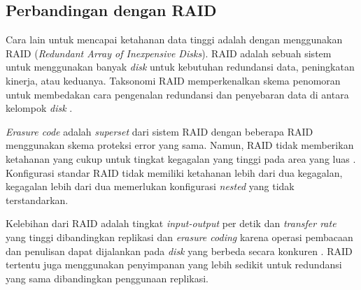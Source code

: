 \subsection{Perbandingan dengan RAID}

Cara lain untuk mencapai ketahanan data tinggi adalah dengan menggunakan RAID (\textit{Redundant Array of Inexpensive Disks}). RAID adalah sebuah sistem untuk menggunakan banyak \textit{disk} untuk kebutuhan redundansi data, peningkatan kinerja, atau keduanya. Taksonomi RAID memperkenalkan skema penomoran untuk membedakan cara pengenalan redundansi dan penyebaran data di antara kelompok \textit{disk} \parencite{katz2010raid}.


\textit{Erasure code} adalah \textit{superset} dari sistem RAID dengan beberapa RAID menggunakan skema proteksi error yang sama. Namun, RAID tidak memberikan ketahanan yang cukup untuk tingkat kegagalan yang tinggi pada area yang luas \parencite{weatherspoon2002erasure}. Konfigurasi standar RAID tidak memiliki ketahanan lebih dari dua kegagalan, kegagalan lebih dari dua memerlukan konfigurasi \textit{nested} yang tidak terstandarkan.

Kelebihan dari RAID adalah tingkat \textit{input-output} per detik dan \textit{transfer rate} yang tinggi dibandingkan replikasi dan \textit{erasure coding} karena operasi pembacaan dan penulisan dapat dijalankan pada \textit{disk} yang berbeda secara konkuren \parencite{katz2010raid}. RAID tertentu juga menggunakan penyimpanan yang lebih sedikit untuk redundansi yang sama dibandingkan penggunaan replikasi. 